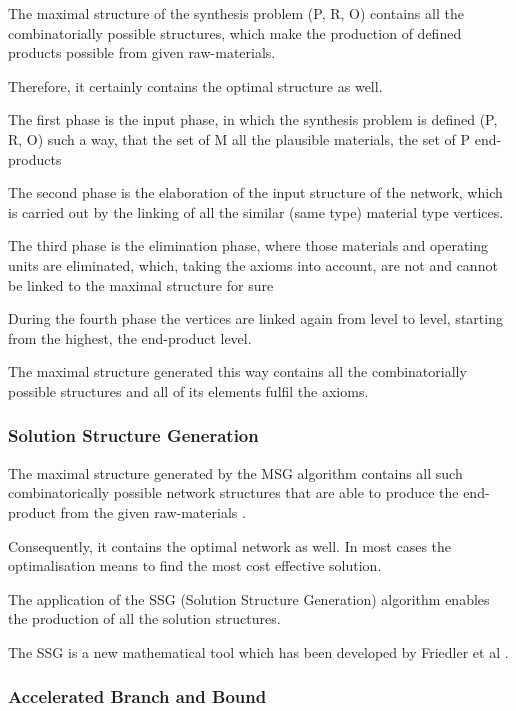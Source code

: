 The maximal structure of the synthesis problem (P, R, O) 
contains all the combinatorially possible structures,
which make the production of defined products possible 
from given raw-materials. \cite{pns2}\cite{algo}
 
Therefore, it certainly contains the optimal structure as well.

The first phase is the input phase, in which the synthesis problem 
is defined (P, R, O) such a way, that the set of M all the plausible materials, 
the set of P end-products 

The second phase is the elaboration of the input structure of the network, 
which is carried out by the linking of all the similar (same type) material type vertices.

The third phase is the elimination phase, where those materials 
and operating units are eliminated, which, taking the  axioms into account,
are not and cannot be linked to the maximal structure for sure

During the fourth phase the vertices are linked again from level to level, 
starting from the highest, the end-product level.

The maximal structure generated this way contains all the combinatorially possible 
structures and all of its elements fulfil the  axioms\cite{pns2, algo}.

\subsubsection{Solution Structure Generation}

The maximal structure generated by the MSG algorithm contains all such combinatorically 
possible network structures that are able to produce the end-product from the given raw-materials \cite{pns2 ,algo}.

Consequently, it contains the optimal network as well. 
In most cases the optimalisation means  to find the most cost effective solution.

The application of the SSG (Solution Structure Generation) algorithm 
enables the production of all the solution structures. 

The SSG is a new mathematical tool  which has been developed by Friedler et al \cite{pns2, algo}.

\subsubsection{Accelerated Branch and Bound}

